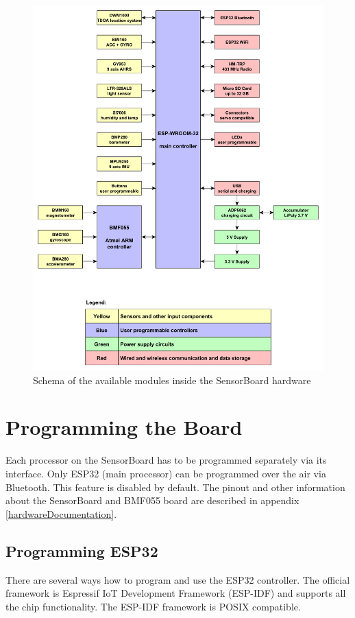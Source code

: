 \begin{figure}
	\centering
	\label{fig:SWmodules}
	\caption{Schema of the available modules inside the SensorBoard hardware}
	\includegraphics[width=16cm]{img/SensorBoardSchema.pdf}
\end{figure}

\section{Programming the Board}
Each processor on the SensorBoard has to be programmed separately via its interface. Only ESP32 \cite{espressif:ESP-WROOM-32} (main processor) can be programmed over the air via Bluetooth. This feature is disabled by default. The pinout and other information about the SensorBoard and BMF055 board are described in appendix \ref{hardwareDocumentation}.

\subsection{Programming ESP32}
There are several ways how to program and use the ESP32 \cite{espressif:ESP-WROOM-32} controller. The official framework is Espressif IoT Development Framework (ESP-IDF) \cite{espressif:ESP-IDF} and supports all the chip functionality. The ESP-IDF framework is POSIX compatible.

